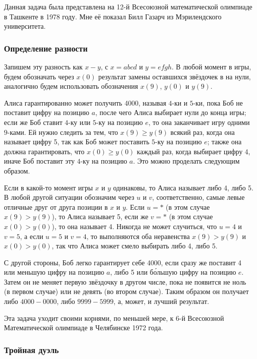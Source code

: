 Данная задача была представлена на 12-й Всесоюзной математической олимпиаде в Ташкенте в 1978 году.
Мне её показал Билл Газарч из Мэрилендского университета.%

\subsubsection*{Определение разности}%

Запишем эту разность как $x-y$, с $x=abcd$ и $y=efgh$.
В любой момент в игры, будем обозначать через $x(0)$ результат замены оставшихся звёздочек в на нули, аналогично будем использовать обозначения $x(9)$, $y(0)$ и $y(9)$.

Алиса гарантированно может получить 4000, называя $4$-ки и $5$-ки, пока Боб не поставит цифру на позицию $a$, после чего Алиса выбирает нули до конца игры;
если же Боб ставит $4$-ку или $5$-ку на позицию $e$, то она заканчивает игру одними $9$-ками.
Ей нужно следить за тем, что $x(9)\ge y(9)$ всякий раз, когда она называет цифру 5, так как Боб может поставить $5$-ку на позицию $e$;
также она должна гарантировать, что $x(0)\ge y(0)$ каждый раз, когда выбирает цифру 4, иначе Боб поставит эту $4$-ку на позицию $a$.
Это можно проделать следующим образом.

Если в какой-то момент игры $x$ и $y$ одинаковы, то Алиса называет либо 4, либо 5.
В любой другой ситуации обозначим через $u$ и $v$, соответственно, самые левые отличные друг от друга позиции в $x$ и $y$.
Если $u=*$ (в этом случае $x(9)> y(9)$), то Алиса называет 5, если же $v=*$ (в этом случае $x(0)> y(0)$), то она называет 4.
Никогда не может случиться, что $u=4$ и $v=5$, а если $u=5$ и $v=4$, то выполняются оба неравенства $x(9)> y(9)$ и $x(0)> y(0)$, так что Алиса может смело выбирать либо 4, либо 5.

С другой стороны, Боб легко гарантирует себе 4000, если сразу же поставит 4 или меньшую цифру на позицию $a$, либо 5 или б\'{о}льшую цифру на позицию $e$.
Затем он не меняет первую звёздочку в другом числе, пока не появится не ноль (в первом случае) или не девять (во втором случае).
Таким образом он получает либо $4000-0000$, либо $9999-5999$, а, может, и лучший результат.
\heart

Эта задача уходит своими корнями, по меньшей мере, к 6-й Всесоюзной Математической олимпиаде в Челябинске 1972 года.

\subsubsection*{Тройная дуэль}%

